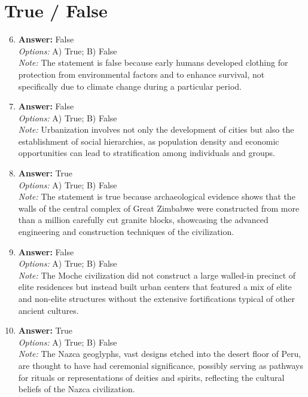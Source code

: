 \documentclass[12pt]{article}
\begin{document}
\section*{True / False}
\begin{enumerate}[label=\arabic*.]
\setcounter{enumi}{5}
\item \textbf{Answer:} False
\\ \textit{Options:} A) True; B) False
\\ \textit{Note:} The statement is false because early humans developed clothing for protection from environmental factors and to enhance survival, not specifically due to climate change during a particular period.
\item \textbf{Answer:} False
\\ \textit{Options:} A) True; B) False
\\ \textit{Note:} Urbanization involves not only the development of cities but also the establishment of social hierarchies, as population density and economic opportunities can lead to stratification among individuals and groups.
\item \textbf{Answer:} True
\\ \textit{Options:} A) True; B) False
\\ \textit{Note:} The statement is true because archaeological evidence shows that the walls of the central complex of Great Zimbabwe were constructed from more than a million carefully cut granite blocks, showcasing the advanced engineering and construction techniques of the civilization.
\item \textbf{Answer:} False
\\ \textit{Options:} A) True; B) False
\\ \textit{Note:} The Moche civilization did not construct a large walled-in precinct of elite residences but instead built urban centers that featured a mix of elite and non-elite structures without the extensive fortifications typical of other ancient cultures.
\item \textbf{Answer:} True
\\ \textit{Options:} A) True; B) False
\\ \textit{Note:} The Nazca geoglyphs, vast designs etched into the desert floor of Peru, are thought to have had ceremonial significance, possibly serving as pathways for rituals or representations of deities and spirits, reflecting the cultural beliefs of the Nazca civilization.
\end{enumerate}
\end{document}

